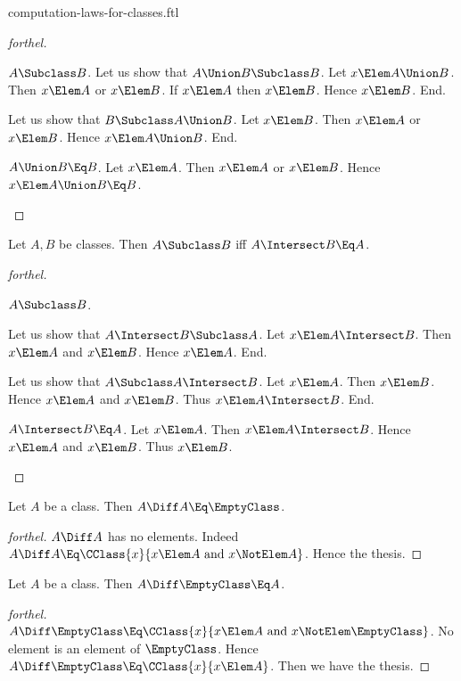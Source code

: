 \documentclass{stex}
\begin{document}
\begin{smodule}{computation-laws-for-classes.ftl}
\begin{proof}[forthel]
\begin{case}{$A \Subclass B$.}
    Let us show that $A \Union B \Subclass B$.
      Let $x \Elem A \Union B$.
      Then $x \Elem A$ or $x \Elem B$.
      If $x \Elem A$ then $x \Elem B$.
      Hence $x \Elem B$.
    End.

    Let us show that $B \Subclass A \Union B$.
      Let $x \Elem B$.
      Then $x \Elem A$ or $x \Elem B$.
      Hence $x \Elem A \Union B$.
    End.
  \end{case}

  \begin{case}{$A \Union B \Eq B$.}
    Let $x \Elem A$.
    Then $x \Elem A$ or $x \Elem B$.
    Hence $x \Elem A \Union B \Eq B$.
  \end{case}
\end{proof}

\begin{proposition*}[forthel]
  Let $A, B$ be classes.
  Then $A \Subclass B$ iff $A \Intersect B \Eq A$.
\end{proposition*}
\begin{proof}[forthel]
  \begin{case}{$A \Subclass B$.}

    Let us show that $A \Intersect B \Subclass A$.
      Let $x \Elem A \Intersect B$.
      Then $x \Elem A$ and $x \Elem B$.
      Hence $x \Elem A$.
    End.

    Let us show that $A \Subclass A \Intersect B$.
      Let $x \Elem A$.
      Then $x \Elem B$.
      Hence $x \Elem A$ and $x \Elem B$.
      Thus $x \Elem A \Intersect B$.
    End.
  \end{case}

  \begin{case}{$A \Intersect B \Eq A$.}
    Let $x \Elem A$.
    Then $x \Elem A \Intersect B$.
    Hence $x \Elem A$ and $x \Elem B$.
    Thus $x \Elem B$.
  \end{case}
\end{proof}

\begin{proposition*}[forthel]
  Let $A$ be a class.
  Then $A \Diff A \Eq \EmptyClass$.
\end{proposition*}
\begin{proof}[forthel]
  $A \Diff A$ has no elements.
  Indeed $A \Diff A \Eq \CClass{x}{x \Elem A\text{ and }x \NotElem A}$.
  Hence the thesis.
\end{proof}

\begin{proposition*}[forthel]
  Let $A$ be a class.
  Then $A \Diff \EmptyClass \Eq A$.
\end{proposition*}
\begin{proof}[forthel]
  $A \Diff \EmptyClass \Eq \CClass{x}{x \Elem A\text{ and }x \NotElem \EmptyClass}$.
  No element is an element of $\EmptyClass$.
  Hence $A \Diff \EmptyClass \Eq \CClass{x}{x \Elem A}$.
  Then we have the thesis.
\end{proof}


\end{smodule}
\end{document}
